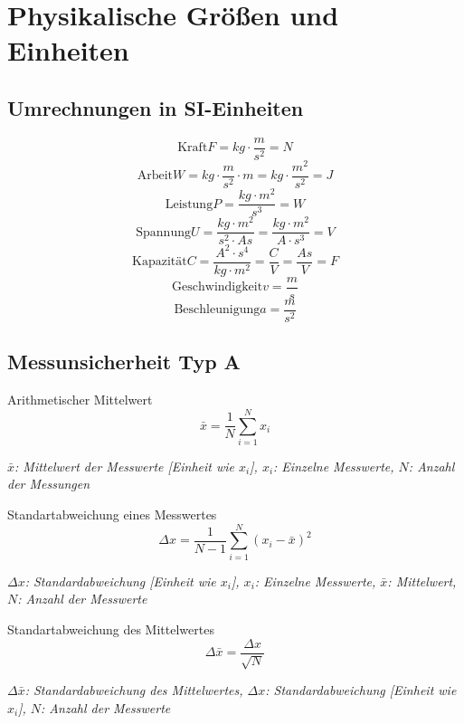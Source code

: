 \documentclass[a4paper,10pt]{article}
\newenvironment{displayformula}
{
	\begin{framed}
		\color{formulaColor}
	}
	{\end{framed}}
\newcommand{\formulalegend}[1]{%
	\par\vspace{0.5ex}%
	{{\color{legendColor}\RaggedRight\small\textit{#1}}}%
	\par\vspace{1.5ex}%
}
\begin{document}
	\tableofcontents
	
	
	\section{Physikalische Größen und Einheiten}
	
	\subsection{Umrechnungen in SI-Einheiten}
	
	\begin{displayformula}
		\[
		\text{Kraft} F = kg \cdot \frac{m}{s^2} = N
		\]
		\[
		\text{Arbeit} W = kg \cdot \frac{m}{s^2} \cdot m = kg \cdot \frac{m^2}{s^2} = J
		\]
		\[
		\text{Leistung} P = \frac{kg \cdot m^2}{s^3} = W
		\]
		\[
		\text{Spannung} U = \frac{kg \cdot m^2}{s^2 \cdot As} = \frac{kg \cdot m^2}{A \cdot s^3} = V
		\]
		\[
		\text{Kapazität} C = \frac{A^2 \cdot s^4}{kg \cdot m^2} = \frac{C}{V} = \frac{As}{V} = F
		\]
		\[
		\text{Geschwindigkeit} v = \frac{m}{s}
		\]
		\[
		\text{Beschleunigung} a = \frac{m}{s^2}
		\]
	\end{displayformula}
	
	
	\subsection{Messunsicherheit Typ A}
	
	\begin{displayformula}
		Arithmetischer Mittelwert
		\[
		\bar{x} = \frac{1}{N} \sum_{i=1}^{N} x_i
		\]
	\end{displayformula}
	\formulalegend{
		\( \bar{x} \): Mittelwert der Messwerte [Einheit wie \( x_i \)], \( x_i \): Einzelne Messwerte, \( N \): Anzahl der Messungen
	}
	
	\begin{displayformula}
		Standartabweichung eines Messwertes
		\[
		\Delta x = \frac{1}{N - 1} \sum_{i = 1}^{N} (x_i - \bar{x})^2
		\]	
	\end{displayformula}
	\formulalegend{
		\( \Delta x \): Standardabweichung [Einheit wie \( x_i \)], \( x_i \): Einzelne Messwerte, \( \bar{x} \): Mittelwert, \( N \): Anzahl der Messwerte
	}
	
	\begin{displayformula}
		Standartabweichung des Mittelwertes
		\[
		\Delta \bar{x} = \frac{\Delta x}{\sqrt{N}} 
		\]	
	\end{displayformula}
	\formulalegend{
		\( \Delta \bar{x} \): Standardabweichung des Mittelwertes, \( \Delta x \): Standardabweichung [Einheit wie \( x_i \)], \( N \): Anzahl der Messwerte
	}
	
\end{document}
